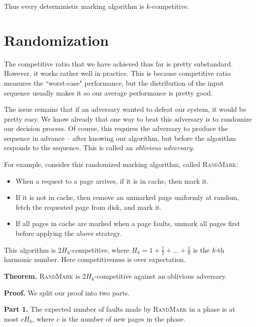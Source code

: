 \documentclass[14pt]{extreport}
\begin{document}
    \vspace{2mm}
    Thus every deterministic marking algorithm is $k$-competitive.


\section*{Randomization}
    The competitive ratio that we have achieved thus far is pretty substandard. However, it works rather well in practice. This is because competitive ratio measures the ``worst-case" performance, but the distribution of the input sequence usually makes it so our average performance is pretty good.

    \vspace{2mm}
    The issue remains that if an adversary wanted to defeat our system, it would be pretty easy. We know already that one way to beat this adversary is to randomize our decision process. Of course, this requires the adversary to produce the sequence in advance -- after knowing our algorithm, but before the algorithm responds to the sequence. This is called an \textit{oblivious adversary}.

    \vspace{2mm}
    For example, consider this randomized marking algorithm, called \textsc{RandMark}: 
    \begin{itemize}
        \item When a request to a page arrives, if it is in cache, then mark it.
        \item If it is not in cache, then remove an unmarked page uniformly at random, fetch the requested page from disk, and mark it.
        \item If all pages in cache are marked when a page faults, unmark all pages first before applying the above strategy.
    \end{itemize}
    This algorithm is $2H_{k}$-competitive, where $H_{k} = 1 + \frac{1}{2} + \dots + \frac{1}{k}$ is the $k$-th harmonic number. Here competitiveness is over expectation.

    \vspace{3mm}
    \textbf{Theorem.} \textsc{RandMark} is $2H_k$-competitive against an oblivious adversary.

    \vspace{3mm}
    \textbf{Proof.}
    We split our proof into two parts.

    \vspace{5mm}
    \textbf{Part 1. } The expected number of faults made by \textsc{RandMark} in a phase is at most $cH_k$, where $c$ is the number of new pages in the phase.
\end{document}
